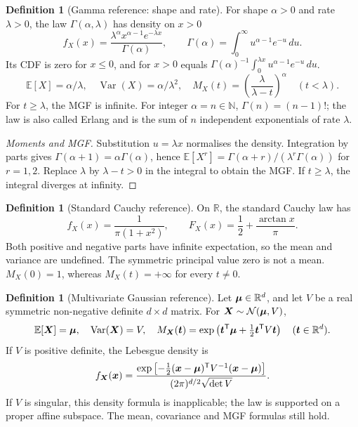 \documentclass[11pt]{article}
\numberwithin{equation}{section}
\theoremstyle{definition}
\newtheorem{definition}[theorem]{Definition}
\theoremstyle{remark}
\newcommand{\RR}{\mathbb R}
\newcommand{\NN}{\mathbb N}
\newcommand{\Expt}{\mathbb E}
\DeclareMathOperator{\Var}{Var}
\newcommand{\Normal}{\mathcal N}
\begin{document}
\begin{definition}[Gamma reference: shape and rate]\label{probability-definition-082}
For shape \(\alpha>0\) and rate \(\lambda>0\), the law \(\Gamma(\alpha,\lambda)\)
has density on \(x>0\)
\[f_X(x)=\frac{\lambda^\alpha x^{\alpha-1}e^{-\lambda x}}{\Gamma(\alpha)},
\qquad\Gamma(\alpha)=\int_0^\infty u^{\alpha-1}e^{-u}\,du.\]
Its CDF is zero for \(x\le0\), and for \(x>0\) equals
\(\Gamma(\alpha)^{-1}\int_0^{\lambda x}u^{\alpha-1}e^{-u}\,du\).
\[\Expt[X]=\alpha/\lambda,\quad\Var(X)=\alpha/\lambda^2,\quad
M_X(t)=\left(\frac{\lambda}{\lambda-t}\right)^\alpha\quad(t<\lambda).\]
For \(t\ge\lambda\), the MGF is infinite. For integer \(\alpha=n\in\NN\),
\(\Gamma(n)=(n-1)!\); the law is also called Erlang and is the sum of \(n\)
independent exponentials of rate \(\lambda\).
\end{definition}
\begin{proof}[Moments and MGF]\label{probability-proof-097}
Substitution \(u=\lambda x\) normalises the density.
Integration by parts gives \(\Gamma(\alpha+1)=\alpha\Gamma(\alpha)\), hence
\(\Expt[X^r]=\Gamma(\alpha+r)/(\lambda^r\Gamma(\alpha))\) for
\(r=1,2\). Replace \(\lambda\) by \(\lambda-t>0\) in the integral to
obtain the MGF. If \(t\ge\lambda\), the integral diverges at infinity.
\end{proof}

\begin{definition}[Standard Cauchy reference]\label{probability-definition-083}
On \(\RR\), the standard Cauchy law has
\[f_X(x)=\frac1{\pi(1+x^2)},\qquad F_X(x)=\frac12+\frac{\arctan x}{\pi}.\]
Both positive and negative parts have infinite expectation, so the mean and
variance are undefined. The symmetric principal value zero is not a mean.
\(M_X(0)=1\), whereas \(M_X(t)=+\infty\) for every \(t\ne0\).
\end{definition}

\begin{definition}[Multivariate Gaussian reference]\label{probability-definition-084}
Let \(\vb\mu\in\RR^d\), and let \(V\) be a real symmetric non-negative
 definite \(d\times d\) matrix. For \(\vb X\sim\Normal(\vb\mu,V)\),
\[\Expt[\vb X]=\vb\mu,\quad\Var(\vb X)=V,\quad
M_{\vb X}(\vb t)=\exp\left(\vb t^{\mathsf T}\vb\mu+
\tfrac12\vb t^{\mathsf T}V\vb t\right)\quad(\vb t\in\RR^d).\]
If \(V\) is positive definite, the Lebesgue density is
\[f_{\vb X}(\vb x)=\frac{\exp\left[-\tfrac12(\vb x-\vb\mu)^{\mathsf T}
 V^{-1}(\vb x-\vb\mu)\right]}{(2\pi)^{d/2}\sqrt{\det V}}.\]
If \(V\) is singular, this density formula is inapplicable; the law is supported
on a proper affine subspace. The mean, covariance and MGF formulas still hold.
\end{definition}
\end{document}
